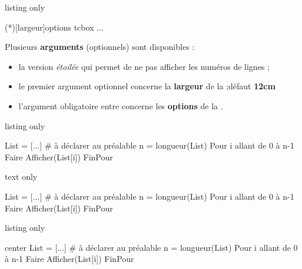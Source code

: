 \documentclass[a4paper,french,11pt]{article}
\newcommand\ctex[1]{\tcbox[vignettelatex]{#1}}
\newcommand\cmaj[1]{%
	{\tcbox[vignetteMaJ]{#1}\xspace}%
}
\newcommand\Cle[1]{{\bfseries\sffamily\textlangle \textcolor{orange!75!black}{#1}\textrangle}}
\begin{document}
\begin{PresCodeTexPL}{listing only}
\begin{PseudoCodeAlt}(*)[largeur]{options tcbox}
...
\end{PseudoCodeAlt}
\end{PresCodeTexPL}

\begin{cautionblock}
Plusieurs \Cle{arguments} (optionnels) sont disponibles :

\begin{itemize}
	\item la version \textit{étoilée} qui permet de ne pas afficher les numéros de lignes ;
	\item le premier argument optionnel concerne la \Cle{largeur} de la \ctex{tcbox} ;\hfill{}défaut \Cle{12cm}
	\item \cmaj{2.5.8} l'argument obligatoire entre \ctex{\{...\}} concerne les \Cle{options} de la \ctex{tcbox}.
\end{itemize}
\vspace*{-\baselineskip}\leavevmode
\end{cautionblock}

\begin{PresCodeTexPL}{listing only}
\begin{PseudoCode}{} %
List = [...]          # à déclarer au préalable
n = longueur(List)
Pour i allant de 0 à n-1 Faire
	Afficher(List[i])
FinPour
\end{PseudoCode}
\end{PresCodeTexPL}

\begin{PresCodeSortiePL}{text only}
\begin{PseudoCode}{}
List = [...]          # à déclarer au préalable
n = longueur(List)
Pour i allant de 0 à n-1 Faire
	Afficher(List[i])
FinPour
\end{PseudoCode}
\end{PresCodeSortiePL}

\begin{PresCodeTexPL}{listing only}
\begin{PseudoCodeAlt}[15cm]{center} %
List = [...]          # à déclarer au préalable
n = longueur(List)
Pour i allant de 0 à n-1 Faire
	Afficher(List[i])
FinPour
\end{PseudoCodeAlt}
\end{PresCodeTexPL}
\end{document}
